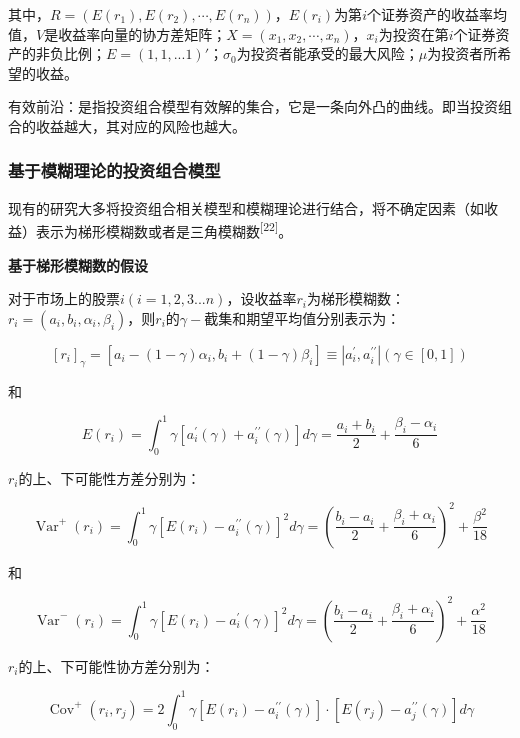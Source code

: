 \documentclass[]{article}
\begin{document}
其中，\(R=\left(E\left(r_{1}\right), E\left(r_{2}\right), \cdots, E\left(r_{n}\right)\right)\)，\(E(r_{i})\)为第\(i\)个证券资产的收益率均值，\(V\)是收益率向量的协方差矩阵；\(X=\left(x_{1}, x_{2}, \cdots, x_{n}\right)\)，\(x_{i}\)为投资在第\(i\)个证券资产的非负比例；\(E=(1,1,...1)'\)；\(\sigma_{0}\)为投资者能承受的最大风险；\(\mu\)为投资者所希望的收益。

有效前沿：是指投资组合模型有效解的集合，它是一条向外凸的曲线。即当投资组合的收益越大，其对应的风险也越大。

\hypertarget{header-n47}{%
\subsubsection{基于模糊理论的投资组合模型}\label{header-n47}}

现有的研究大多将投资组合相关模型和模糊理论进行结合，将不确定因素（如收益）表示为梯形模糊数或者是三角模糊数\textsuperscript{{[}22{]}}。

\textbf{基于梯形模糊数的假设}

对于市场上的股票\(i(i=1,2,3...n)\)，设收益率\(r_{i}\)为梯形模糊数：\(r_{i}=(a_{i},b_{i},\alpha_{i},\beta_{i})\)，则\(r_{i}\)的\(\gamma-\)截集和期望平均值分别表示为：

\[\left[r_{i}\right]_{\gamma}=\left[a_{i}-(1-\gamma) \alpha_{i}, b_{i}+(1-\gamma) \beta_{i}\right] \equiv\left|a_{i}^{\prime}, a_{i}^{\prime \prime}\right|(\gamma \in[0,1])\]

和

\[E\left(r_{i}\right)=\int_{0}^{1} \gamma\left[a_{i}^{\prime}(\gamma)+a_{i}^{\prime \prime}(\gamma)\right] d \gamma=\frac{a_{i}+b_{i}}{2}+\frac{\beta_{i}-\alpha_{i}}{6}\]

\(r_{i}\)的上、下可能性方差分别为：

\[\operatorname{Var}^{+}\left(r_{i}\right)=\int_{0}^{1} \gamma\left[E\left(r_{i}\right)-a_{i}^{\prime \prime}(\gamma)\right]^{2} d \gamma=\left(\frac{b_{i}-a_{i}}{2}+\frac{\beta_{i}+\alpha_{i}}{6}\right)^{2}+\frac{\beta^{2}}{18}\]

和

\[\operatorname{Var}^{-}\left(r_{i}\right)=\int_{0}^{1} \gamma\left[E\left(r_{i}\right)-a_{i}^{\prime}(\gamma)\right]^{2} d \gamma=\left(\frac{b_{i}-a_{i}}{2}+\frac{\beta_{i}+\alpha_{i}}{6}\right)^{2}+\frac{\alpha^{2}}{18}\]

\(r_{i}\)的上、下可能性协方差分别为：

\[\operatorname{Cov}^{+}\left(r_{i}, r_{j}\right)=2 \int_{0}^{1} \gamma\left[E\left(r_{i}\right)-a_{i}^{\prime \prime}(\gamma)\right] \cdot\left[E\left(r_{j}\right)-a_{j}^{\prime \prime}(\gamma)\right] d \gamma\]
\end{document}

